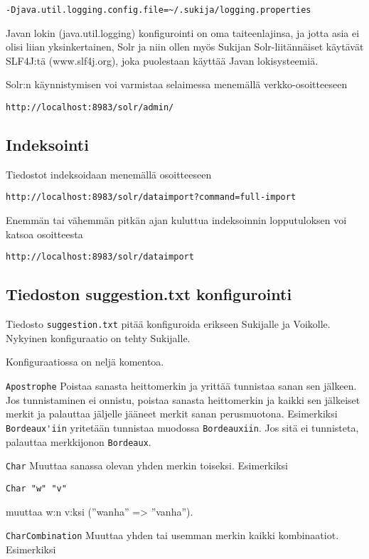 \documentclass[12pt,a4paper]{scrartcl}
\begin{document}
\verb|-Djava.util.logging.config.file=~/.sukija/logging.properties|


Javan lokin (java.util.logging) konfigurointi on oma taiteenlajinsa,
ja jotta asia ei olisi liian yksinkertainen, Solr ja niin ollen myös
Sukijan Solr-liitännäiset käytävät SLF4J:tä (www.slf4j.org), joka
puolestaan käyttää Javan lokisysteemiä.

Solr:n käynnistymisen voi varmistaa selaimessa menemällä verkko-osoitteeseen

\verb|http://localhost:8983/solr/admin/|


\subsection*{Indeksointi}

Tiedostot indeksoidaan menemällä osoitteeseen

\verb|http://localhost:8983/solr/dataimport?command=full-import|

Enemmän tai vähemmän pitkän ajan kuluttua indeksoinnin lopputuloksen
voi katsoa osoitteesta

\verb|http://localhost:8983/solr/dataimport|



\subsection*{Tiedoston suggestion.txt konfigurointi}

Tiedosto \verb|suggestion.txt| pitää konfiguroida erikseen Sukijalle
ja Voikolle. Nykyinen konfiguraatio on tehty Sukijalle.

Konfiguraatiossa on neljä komentoa.

\bigskip
\verb|Apostrophe| Poistaa sanasta heittomerkin ja yrittää tunnistaa
sanan sen jälkeen. Jos tunnistaminen ei onnistu, poistaa sanasta
heittomerkin ja kaikki sen jälkeiset merkit ja palauttaa jäljelle
jääneet merkit sanan perusmuotona. Esimerkiksi \verb|Bordeaux'iin|
yritetään tunnistaa muodossa \verb|Bordeauxiin|. Jos sitä ei
tunnisteta, palauttaa merkkijonon \verb|Bordeaux|.

\bigskip
\verb|Char| Muuttaa sanassa olevan yhden merkin toiseksi. Esimerkiksi

\verb|Char "w" "v"|

muuttaa w:n v:ksi (''wanha'' => ''vanha'').

\bigskip
\verb|CharCombination| Muuttaa yhden tai usemman merkin kaikki
kombinaatiot. Esimerkiksi
\end{document}
